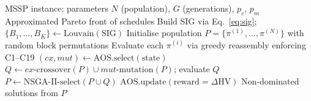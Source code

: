 \begin{algorithm}[t]
\caption{BDM-AOS: Bi-Level Decomposition Matheuristic with Adaptive Operator Selection}
\label{alg:bdmaos}
\begin{algorithmic}[1]
\REQUIRE MSSP instance; parameters $N$ (population), $G$ (generations), $p_c$, $p_m$
\ENSURE Approximated Pareto front of schedules
\STATE Build SIG via Eq.~\eqref{eq:sig}; $\{B_1,\ldots,B_K\} \leftarrow \mathrm{Louvain(SIG)}$
\STATE Initialise population $P = \{\pi^{(1)},\ldots,\pi^{(N)}\}$ with random block permutations
\STATE Evaluate each $\pi^{(i)}$ via greedy reassembly enforcing C1--C19
  \STATE $(cx, mut) \leftarrow \mathrm{AOS.select}(\mathrm{state})$ \hfill{}
  \STATE $Q \leftarrow cx\text{-crossover}(P) \cup mut\text{-mutation}(P)$; evaluate $Q$
  \STATE $P \leftarrow \mathrm{NSGA\text{-}II\text{-}select}(P \cup Q)$
  \STATE $\mathrm{AOS.update}(\text{reward} = \Delta\mathrm{HV})$
\ENDFOR
\RETURN Non-dominated solutions from $P$
\end{algorithmic}
\end{algorithm}

